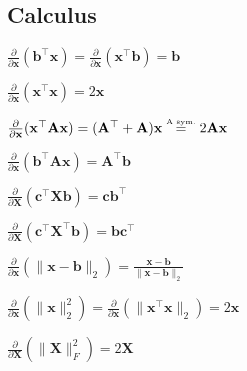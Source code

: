 \subsection*{Calculus}
\begin{inparaitem}[\color{red}\textbullet]
	\item $\frac{\partial}{\partial \mathbf{x}}(\mathbf{b}^\top \mathbf{x}) = \frac{\partial}{\partial \mathbf{x}}(\mathbf{x}^\top \mathbf{b}) = \mathbf{b}$
	\item $\frac{\partial}{\partial \mathbf{x}}(\mathbf{x}^\top \mathbf{x}) = 2\mathbf{x}$ \\
	\item $\frac{\partial}{\partial \mathbf{x}}(\mathbf{x}^\top \mathbf{A}\mathbf{x}) = (\mathbf{A}^\top + \mathbf{A})\mathbf{x} \stackrel{\text{\tiny A sym.}}{=} 2\mathbf{A}\mathbf{x}$ \\
	\item $\frac{\partial}{\partial \mathbf{x}}(\mathbf{b}^\top \mathbf{A}\mathbf{x}) = \mathbf{A}^\top \mathbf{b}$
	\item $\frac{\partial}{\partial \mathbf{X}}(\mathbf{c}^\top \mathbf{X} \mathbf{b}) = \mathbf{c}\mathbf{b}^\top$ \\
	\item $\frac{\partial}{\partial \mathbf{X}}(\mathbf{c}^\top \mathbf{X}^\top \mathbf{b}) = \mathbf{b}\mathbf{c}^\top$
	\item $\frac{\partial}{\partial \mathbf{x}}(\| \mathbf{x}-\mathbf{b} \|_2) = \frac{\mathbf{x}-\mathbf{b}}{\|\mathbf{x}-\mathbf{b}\|_2}$ \\
	\item $\frac{\partial}{\partial \mathbf{x}}(\|\mathbf{x}\|^2_2) = \frac{\partial}{\partial \mathbf{x}} (\|\mathbf{x}^\top \mathbf{x}\|_2) = 2\mathbf{x}$
	\item $\frac{\partial}{\partial \mathbf{X}}(\|\mathbf{X}\|_F^2) = 2\mathbf{X}$ \\

\end{inparaitem}
